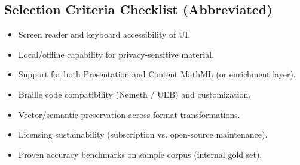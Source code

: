 \subsection{Selection Criteria Checklist (Abbreviated)}
\begin{itemize}
	\item Screen reader and keyboard accessibility of UI.
	\item Local/offline capability for privacy-sensitive material.\supercite{DataPrivacyAI}
	\item Support for both Presentation and Content MathML (or enrichment layer).
	\item Braille code compatibility (Nemeth / UEB) and customization.
	\item Vector/semantic preservation across format transformations.
	\item Licensing sustainability (subscription vs. open-source maintenance).
	\item Proven accuracy benchmarks on sample corpus (internal gold set).
\end{itemize}

